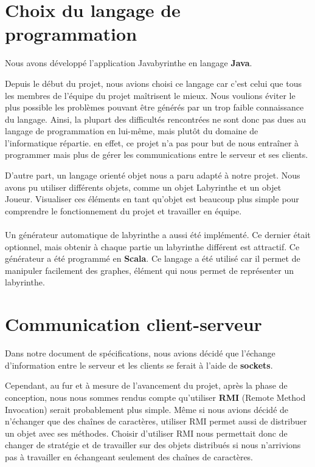 \section{Choix du langage de programmation}
	Nous avons développé l'application Javabyrinthe en langage \textbf{Java}.

	Depuis le début du projet, nous avions choisi ce langage car c'est celui que tous les membres de l'équipe du projet maîtrisent le mieux. Nous voulions éviter le plus possible les problèmes pouvant être générés par un trop faible connaissance du langage. Ainsi, la plupart des difficultés rencontrées ne sont donc pas dues au langage de programmation en lui-même, mais plutôt du domaine de l'informatique répartie. en effet, ce projet n'a pas pour but de nous entraîner à programmer mais plus de gérer les communications entre le serveur et ses clients.

	D'autre part, un langage orienté objet nous a paru adapté à notre projet. Nous avons pu utiliser différents objets, comme un objet Labyrinthe et un objet Joueur. Visualiser ces éléments en tant qu'objet est beaucoup plus simple pour comprendre le fonctionnement du projet et travailler en équipe.
	
	\paragraph*{}
	Un générateur automatique de labyrinthe a aussi été implémenté. Ce dernier était optionnel, mais obtenir à chaque partie un labyrinthe différent est attractif. Ce générateur a été programmé en \textbf{Scala}. Ce langage a été utilisé car il permet de manipuler facilement des graphes, élément qui nous permet de représenter un labyrinthe.

\section{Communication client-serveur}
	Dans notre document de spécifications, nous avions décidé que l'échange d'information entre le serveur et les clients se ferait à l'aide de \textbf{sockets}.

	Cependant, au fur et à mesure de l'avancement du projet, après la phase de conception, nous nous sommes rendus compte qu'utiliser \textbf{RMI} (Remote Method Invocation) serait probablement plus simple. Même si nous avions décidé de n'échanger que des chaînes de caractères, utiliser RMI permet aussi de distribuer un objet avec ses méthodes. Choisir d'utiliser RMI nous permettait donc de changer de stratégie et de travailler sur des objets distribués si nous n'arrivions pas à travailler en échangeant seulement des chaînes de caractères.
	
